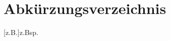 
\chapter*{Abkürzungsverzeichnis}


\begin{acronym}[ABCDEFJKLASDJKLAJSD] %
 [z.B.]{z.Bsp.}
	
\end{acronym}
